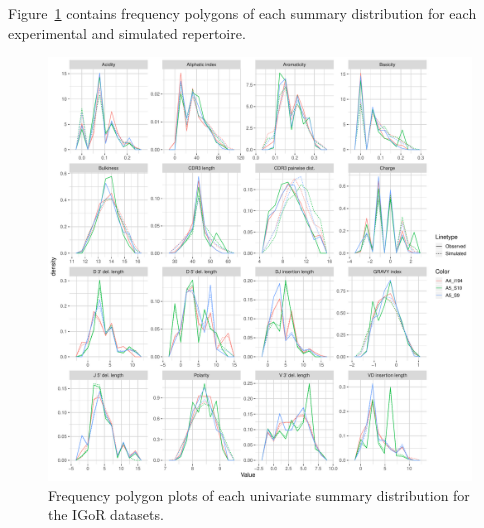 \documentclass{article}
\begin{document}
Figure~\ref{fig:IgorFreqPolys} contains frequency polygons of each summary distribution for each experimental and simulated repertoire.
\begin{figure}
    \includegraphics[width=\linewidth]{Figures/IgorScores/igor_freqpoly.pdf}
    \caption{Frequency polygon plots of each univariate summary distribution for the IGoR datasets.}
    \label{fig:IgorFreqPolys}
\end{figure}
\end{document}
